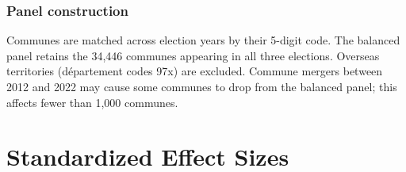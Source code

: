 \documentclass[12pt]{article}
\begin{document}
\subsubsection*{Panel construction} Communes are matched across election years by their 5-digit code. The balanced panel retains the 34,446 communes appearing in all three elections. Overseas territories (d\'epartement codes 97x) are excluded. Commune mergers between 2012 and 2022 may cause some communes to drop from the balanced panel; this affects fewer than 1,000 communes.


\section{Standardized Effect Sizes}
\label{sec:sde}


\end{document}
